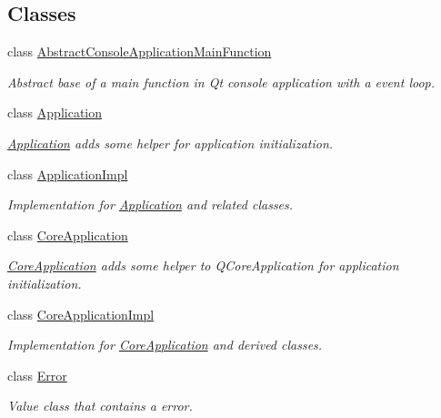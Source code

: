 \subsection*{Classes}
\begin{DoxyCompactItemize}
\item 
class \hyperlink{class_mdt_1_1_abstract_console_application_main_function}{Abstract\+Console\+Application\+Main\+Function}
\begin{DoxyCompactList}\small\item\em Abstract base of a main function in Qt console application with a event loop. \end{DoxyCompactList}\item 
class \hyperlink{class_mdt_1_1_application}{Application}
\begin{DoxyCompactList}\small\item\em \hyperlink{class_mdt_1_1_application}{Application} adds some helper for application initialization. \end{DoxyCompactList}\item 
class \hyperlink{class_mdt_1_1_application_impl}{Application\+Impl}
\begin{DoxyCompactList}\small\item\em Implementation for \hyperlink{class_mdt_1_1_application}{Application} and related classes. \end{DoxyCompactList}\item 
class \hyperlink{class_mdt_1_1_core_application}{Core\+Application}
\begin{DoxyCompactList}\small\item\em \hyperlink{class_mdt_1_1_core_application}{Core\+Application} adds some helper to Q\+Core\+Application for application initialization. \end{DoxyCompactList}\item 
class \hyperlink{class_mdt_1_1_core_application_impl}{Core\+Application\+Impl}
\begin{DoxyCompactList}\small\item\em Implementation for \hyperlink{class_mdt_1_1_core_application}{Core\+Application} and derived classes. \end{DoxyCompactList}\item 
class \hyperlink{class_mdt_1_1_error}{Error}
\begin{DoxyCompactList}\small\item\em Value class that contains a error. \end{DoxyCompactList}\item 

\end{DoxyCompactItemize}
